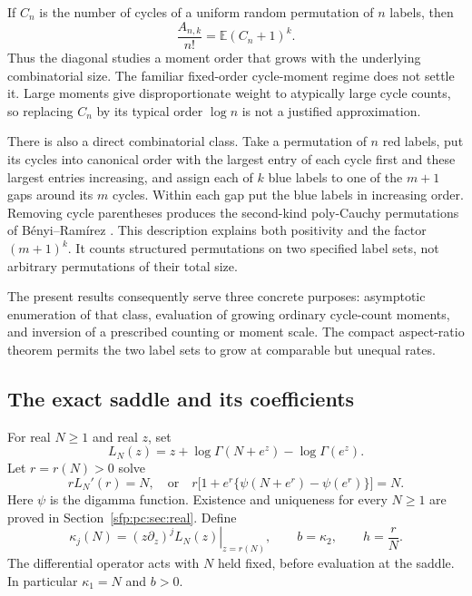 \documentclass[11pt,letterpaper]{article}
\numberwithin{equation}{section}
\theoremstyle{definition}\newtheorem{definition}[theorem]{Definition}
\theoremstyle{remark}\newtheorem{remark}[theorem]{Remark}
\newcommand{\EE}{\mathbb E}
\begin{document}
If $C_n$ is the number of cycles of a uniform random permutation
of $n$ labels, then
\begin{equation}\label{sfp:pc:eq:moment}
 \frac{A_{n,k}}{n!}=\EE(C_n+1)^k.
\end{equation}
Thus the diagonal studies a moment order that grows with the
underlying combinatorial size. The familiar fixed-order cycle-moment
regime does not settle it. Large moments give disproportionate
weight to atypically large cycle counts, so replacing $C_n$ by its
typical order $\log n$ is not a justified approximation.

There is also a direct combinatorial class. Take a permutation of
$n$ red labels, put its cycles into canonical order with the largest
entry of each cycle first and these largest entries increasing,
and assign each of $k$ blue labels to one of the $m+1$ gaps around
its $m$ cycles. Within each gap put the blue labels in increasing
order. Removing cycle parentheses produces the second-kind
poly-Cauchy permutations of B\'enyi--Ram\'irez
\cite[Theorem 2.1]{benyi}. This description explains both positivity
and the factor $(m+1)^k$. It counts structured permutations on two
specified label sets, not arbitrary permutations of their total size.

The present results consequently serve three concrete purposes:
asymptotic enumeration of that class, evaluation of growing ordinary
cycle-count moments, and inversion of a prescribed counting or moment
scale. The compact aspect-ratio theorem permits the two label sets
to grow at comparable but unequal rates.

\subsection{The exact saddle and its coefficients}

For real $N\geq1$ and real $z$, set
\begin{equation}\label{sfp:pc:eq:LN}
 L_N(z)=z+\log\Gamma(N+e^z)-\log\Gamma(e^z).
\end{equation}
Let $r=r(N)>0$ solve
\begin{equation}\label{sfp:pc:eq:saddle}
 rL_N'(r)=N,
 \quad\text{or}\quad
 r\bigl[1+e^r\{\psi(N+e^r)-\psi(e^r)\}\bigr]=N.
\end{equation}
Here $\psi$ is the digamma function. Existence and uniqueness for
every $N\geq1$ are proved in Section~\ref{sfp:pc:sec:real}. Define
\begin{equation}\label{sfp:pc:eq:cumulants}
 \kappa_j(N)=\left.(z\partial_z)^jL_N(z)\right|_{z=r(N)},
 \qquad b=\kappa_2,
 \qquad h=\frac rN.
\end{equation}
The differential operator acts with $N$ held fixed, before evaluation
at the saddle. In particular $\kappa_1=N$ and $b>0$.
\end{document}
